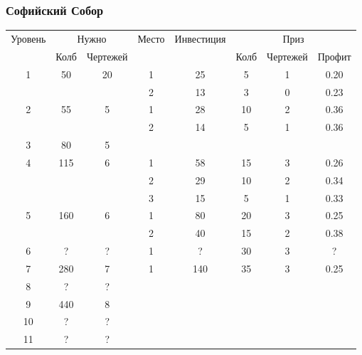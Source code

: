 \subsubsection{Софийский Собор}

\begin{longtable}[c]{|c|c|c|c|c|c|c|c|}
    \hline
    \multirow{ 2}{*}{\small Уровень} &
    \multicolumn{2}{|c|}{\small Нужно} &
    \multirow{ 2}{*}{\small Место} & 
    \multirow{ 2}{*}{\small Инвестиция} & 
    \multicolumn{3}{|c|}{\small Приз} \\\cline{2-3}\cline{6-8}
    &
    {\small Колб} & 
    {\small Чертежей} & 
    & &
    {\small Колб} & 
    {\small Чертежей} & 
    {\small Профит}
    \\\hline\endhead
    \multirow{2}{*}{1} & \multirow{2}{*}{50} & \multirow{2}{*}{20} & 1 & 25 & 5 & 1 & 0.20 \\\cline{4-8}
    & & & 2 & 13 & 3 & 0 & 0.23 \\\hline
    \multirow{2}{*}{2} & \multirow{2}{*}{55} & \multirow{2}{*}{5} & 1 & 28 & 10 & 2 & 0.36 \\\cline{4-8}
    & & & 2 & 14 & 5 & 1 & 0.36 \\\hline
    \multirow{1}{*}{3} & \multirow{1}{*}{80} & \multirow{1}{*}{5} & & & & & \\\hline
    \multirow{3}{*}{4} & \multirow{3}{*}{115} & \multirow{3}{*}{6} & 1 & 58 & 15 & 3 & 0.26 \\\cline{4-8}
    & & & 2 & 29 & 10 & 2 & 0.34 \\\cline{4-8}
    & & & 3 & 15 & 5 & 1 & 0.33 \\\hline
    \multirow{2}{*}{5} & \multirow{2}{*}{160} & \multirow{2}{*}{6} & 1 & 80 & 20 & 3 & 0.25 \\\cline{4-8}
    & & & 2 & 40 & 15 & 2 & 0.38 \\\hline
    \multirow{1}{*}{6} & \multirow{1}{*}{?} & \multirow{1}{*}{?} & 1 & ? & 30 & 3 & ? \\\hline
    \multirow{1}{*}{7} & \multirow{1}{*}{280} & \multirow{1}{*}{7} & 1 & 140 & 35 & 3 & 0.25 \\\hline
    \multirow{1}{*}{8} & \multirow{1}{*}{?} & \multirow{1}{*}{?} & & & & & \\\hline
    \multirow{1}{*}{9} & \multirow{1}{*}{440} & \multirow{1}{*}{8} & & & & & \\\hline
    \multirow{1}{*}{10} & \multirow{1}{*}{?} & \multirow{1}{*}{?} & & & & & \\\hline
    \multirow{1}{*}{11} & \multirow{1}{*}{?} & \multirow{1}{*}{?} & & & & & \\\hline

\end{longtable}
